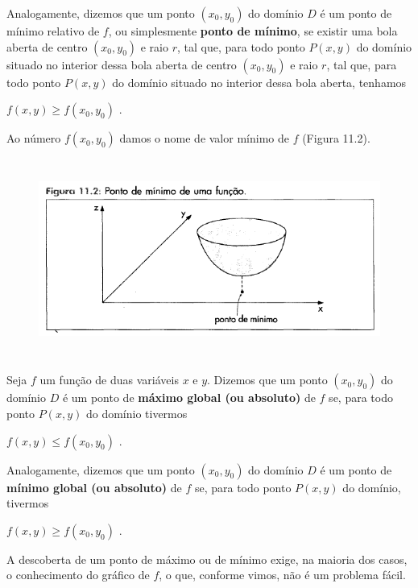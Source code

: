 		Analogamente, dizemos que um ponto $(x_{0}, y_{0})$ do domínio $D$ é um ponto de mínimo relativo de $f$, ou simplesmente \textbf{ponto de mínimo}, se existir uma bola aberta de centro $(x_{0}, y_{0})$ e raio $r$, tal que, para todo ponto $P(x, y)$ do domínio situado no interior dessa bola aberta de centro $(x_{0}, y_{0})$ e raio $r$, tal que, para todo ponto $P(x, y)$ do domínio situado no interior dessa bola aberta, tenhamos

		\medskip

		$f(x, y) \geq f(x_{0}, y_{0})$ .

		\medskip

		Ao número $f(x_{0}, y_{0})$ damos o nome de valor mínimo de $f$ (Figura 11.2).

		\begin{figure}[H]
				\includegraphics[height=6.5cm]{images/morettin_figura-11-2}
		\end{figure}

		Seja $f$ um função de duas variáveis $x$ e $y$. Dizemos que um ponto $(x_{0}, y_{0})$ do domínio $D$ é um ponto de \textbf{máximo global (ou absoluto)} de $f$ se, para todo ponto $P(x, y)$ do domínio tivermos

		\medskip

		$f(x, y) \leq f(x_{0}, y_{0})$ .

		\medskip

		Analogamente, dizemos que um ponto $(x_{0}, y_{0})$ do domínio $D$ é um ponto de \textbf{mínimo global (ou absoluto)} de $f$ se, para todo ponto $P(x, y)$ do domínio, tivermos

		\medskip

		$f(x, y) \geq f(x_{0}, y_{0})$ .

		\medskip

		A descoberta de um ponto de máximo ou de mínimo exige, na maioria dos casos, o conhecimento do gráfico de $f$, o que, conforme vimos, não é um problema fácil.


